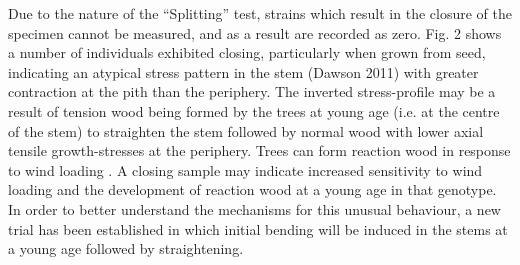 Due to the nature of the “Splitting” test, strains which result in the closure of the specimen cannot be measured, and as a result are recorded as zero. Fig. 2 shows a number of individuals exhibited closing, particularly when grown from seed, indicating an atypical stress pattern in the stem (Dawson 2011) with greater contraction at the pith than the periphery. The inverted stress-profile may be a result of tension wood being formed by the trees at young age (i.e. at the centre of the stem) to straighten the stem followed by normal wood with lower axial tensile growth-stresses at the periphery. Trees can form reaction wood in response to wind loading \citep{coutts1995wind}. A closing sample may indicate increased sensitivity to wind loading and the development of reaction wood at a young age in that genotype. In order to better understand the mechanisms for this unusual behaviour, a new trial has been established in which initial bending will be induced in the stems at a young age followed by straightening.